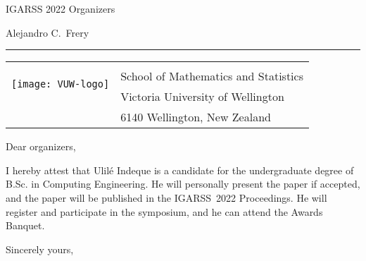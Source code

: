 \documentclass[12pt]{letter} %
\begin{document}
\signature{\texttt{[image: assinatura\_blue-no\_background]}\\
Alejandro C.\ Frery\\
\mbox{Professor of Statistics and Data Science}\\
alejandro.frery@vuw.ac.nz}           %
\longindentation=0pt                       %
\let\raggedleft\raggedright                %
 
\begin{letter}{IGARSS 2022 Organizers}
\date{18 January 2022}

\begin{flushleft}
Alejandro C.\ Frery
\end{flushleft}
\smallskip\hrule height 2pt
\begin{flushright}
\begin{tabular}{rl}
\multirow{3}{*}[20pt]{\texttt{[image: VUW-logo]}}	\\
& \small School of Mathematics and Statistics\\
	& \small Victoria University of Wellington\\
	& \small  6140 Wellington, New Zealand
\end{tabular}
\end{flushright} 
\vfill %

\opening{Dear organizers,} 

I hereby attest that Ulilé Indeque is a candidate for the undergraduate degree of B.Sc. in Computing Engineering.
He will personally present the paper if accepted, and the paper will be published in the IGARSS~2022 Proceedings.
He will register and participate in the symposium, and he can attend the Awards Banquet.

\closing{Sincerely yours,} 
  

\end{letter}
\end{document}
